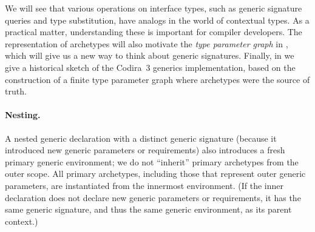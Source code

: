 \documentclass[../generics]{subfiles}
\begin{document}
We will see that various operations on interface types, such as generic signature queries and type substitution, have analogs in the world of contextual types. As a practical matter, understanding these is important for compiler developers. The representation of archetypes will also motivate the \emph{type parameter graph} in , which will give us a new way to think about generic signatures. Finally, in  we give a historical sketch of the Codira~3 generics implementation, based on the construction of a finite type parameter graph where archetypes were the source of truth.

\paragraph{Nesting.}
A nested generic declaration with a distinct generic signature (because it introduced new generic parameters or requirements) also introduces a fresh primary generic environment; we do not ``inherit'' primary archetypes from the outer scope. All primary archetypes, including those that represent outer generic parameters, are instantiated from the innermost environment. (If the inner declaration does not declare new generic parameters or requirements, it has the same generic signature, and thus the same generic environment, as its parent context.)
\end{document}
